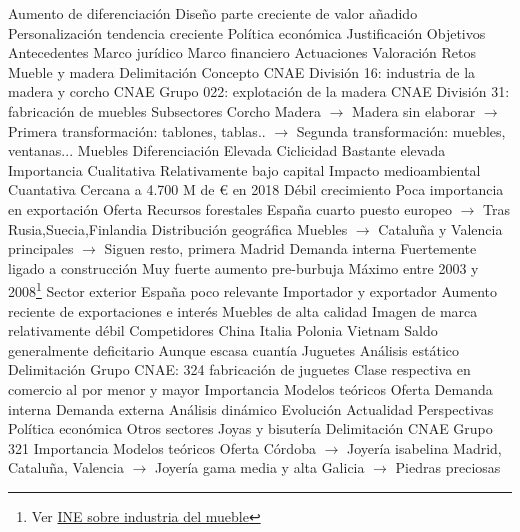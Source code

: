 \documentclass{nuevotema}
\begin{document}
\begin{esquemal}
				\4[] Aumento de diferenciación
				\4[] Diseño parte creciente de valor añadido
				\4[] Personalización tendencia creciente
			\3 Política económica
				\4 Justificación
				\4 Objetivos
				\4 Antecedentes
				\4 Marco jurídico
				\4 Marco financiero
				\4 Actuaciones
				\4 Valoración
				\4 Retos
		\2 Mueble y madera
			\3 Delimitación
				\4 Concepto
				\4[] CNAE División 16: industria de la madera y corcho
				\4[] CNAE Grupo 022: explotación de la madera
				\4[] CNAE División 31: fabricación de muebles
				\4 Subsectores
				\4[] Corcho
				\4[] Madera
				\4[] $\to$ Madera sin elaborar
				\4[] $\to$ Primera transformación: tablones, tablas..
				\4[] $\to$ Segunda transformación: muebles, ventanas...
				\4[] Muebles
				\4 Diferenciación
				\4[] Elevada
				\4 Ciclicidad
				\4[] Bastante elevada
			\3 Importancia
				\4 Cualitativa
				\4[] Relativamente bajo capital
				\4[] Impacto medioambiental
				\4 Cuantativa
				\4[] Cercana a 4.700 M de € en 2018
				\4[] Débil crecimiento
				\4[] Poca importancia en exportación
			\3 Oferta
				\4 Recursos forestales
				\4[] España cuarto puesto europeo
				\4[] $\to$ Tras Rusia,Suecia,Finlandia
				\4 Distribución geográfica
				\4[] Muebles
				\4[] $\to$ Cataluña y Valencia principales
				\4[] $\to$ Siguen resto, primera Madrid
			\3 Demanda interna
				\4 Fuertemente ligado a construcción
				\4 Muy fuerte aumento pre-burbuja
				\4 Máximo entre 2003 y 2008\footnote{Ver \href{https://www.ine.es/jaxiT3/Datos.htm?t=32449\#!tabs-tabla}{INE sobre industria del mueble}}
			\3 Sector exterior
				\4 España poco relevante
				\4[] Importador y exportador
				\4 Aumento reciente de exportaciones e interés
				\4[] Muebles de alta calidad
				\4 Imagen de marca relativamente débil
				\4 Competidores
				\4[] China
				\4[] Italia
				\4[] Polonia
				\4[] Vietnam
				\4 Saldo generalmente deficitario
				\4[] Aunque escasa cuantía
		\2 Juguetes
			\3 Análisis estático
				\4 Delimitación
				\4[] Grupo CNAE: 324 fabricación de juguetes
				\4[] Clase respectiva en comercio al por menor y mayor
				\4 Importancia
				\4 Modelos teóricos
				\4 Oferta
				\4 Demanda interna
				\4 Demanda externa
			\3 Análisis dinámico
				\4 Evolución
				\4 Actualidad
				\4 Perspectivas
			\3 Política económica
		\2 Otros sectores
			\3 Joyas y bisutería
				\4 Delimitación
				\4[] CNAE Grupo 321
				\4 Importancia
				\4 Modelos teóricos
				\4 Oferta
				\4[] Córdoba
				\4[] $\to$ Joyería isabelina
				\4[] Madrid, Cataluña, Valencia
				\4[] $\to$ Joyería gama media y alta
				\4[] Galicia
				\4[] $\to$ Piedras preciosas

\end{esquemal}
\end{document}
